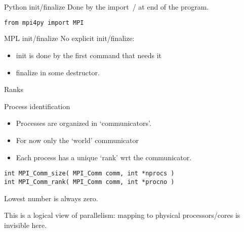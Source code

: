 \begin{python}
  \addtocounter{slidecount}{-1}
\begin{numberedframe}{Python init/finalize}
    Done by the import~/ at end of the program.
\begin{lstlisting}[language=bash,numbers=none]
from mpi4py import MPI
\end{lstlisting}
\end{numberedframe}
\end{python}

\begin{mpl}
  \addtocounter{slidecount}{-1}
\begin{numberedframe}{MPL init/finalize}
    No explicit init/finalize:
    \begin{itemize}
    \item init is done by the first command that needs it
    \item finalize in some destructor.
    \end{itemize}
\end{numberedframe}
\end{mpl}

\begin{exerciseframe}[hello]
  
\end{exerciseframe}

 {Ranks}

\begin{numberedframe}{Process identification}
  \label{sl:comm-world}
  \begin{itemize}
  \item Processes are organized in `communicators'.
  \item For now only the `world' communicator
  \item Each process has a unique `rank' wrt the communicator.
  \end{itemize}
\lstset{language=C}
\begin{lstlisting}[numbers=none]
int MPI_Comm_size( MPI_Comm comm, int *nprocs )
int MPI_Comm_rank( MPI_Comm comm, int *procno )
\end{lstlisting}
Lowest number is always zero.

This is a logical view of parallelism: mapping to physical
processors/cores is invisible here.
\end{numberedframe}

